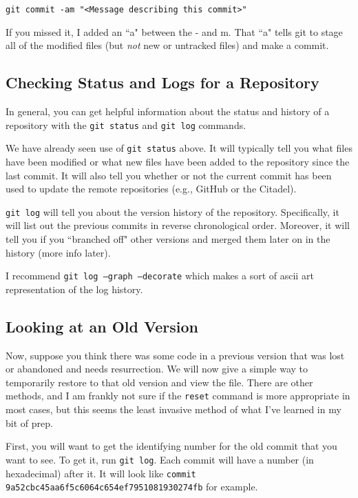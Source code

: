\documentclass[11pt]{article}
\newcommand{\code}[1]{\begin{adjustwidth}{0.5in}{0in}
    \texttt{#1}
    \end{adjustwidth}}
\begin{document}
\code{git commit -am "<Message describing this commit>"}
 
If you missed it, I added an ``a" between the - and m.  That ``a" tells git to stage all of the modified files (but \emph{not} new or untracked files) and make a commit.
 
\subsection{Checking Status and Logs for a Repository}
  
In general, you can get helpful information about the status and history of a repository with the \texttt{git status} and \texttt{git log} commands.  
  
We have already seen use of \texttt{git status} above.  It will typically tell you what files have been modified or what new files have been added to the repository since the last commit.  It will also tell you whether or not the current commit has been used to update the remote repositories (e.g., GitHub or the Citadel).

\texttt{git log} will tell you about the version history of the repository.  Specifically, it will list out the previous commits in reverse chronological order.  Moreover, it will tell you if you ``branched off" other versions and merged them later on in the history (more info later).  

I recommend \texttt{git log --graph --decorate} which makes a sort of ascii art representation of the log history.
 
 \subsection{Looking at an Old Version}
 
 Now, suppose you think there was some code in a previous version that was lost or abandoned and needs resurrection.  We will now give a simple way to temporarily restore to that old version and view the file.  There are other methods, and I am frankly not sure if the \texttt{reset} command is more appropriate in most cases, but this seems the least invasive method of what I've learned in my bit of prep.

First, you will want to get the identifying number for the old commit that you want to see.  To get it, run \texttt{git log}.  Each commit will have a number (in hexadecimal) after it.  It will look like \texttt{commit 9a52cbc45aa6f5c6064c654ef7951081930274fb} for example.  
\end{document}
